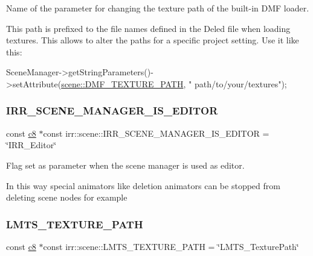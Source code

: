 Name of the parameter for changing the texture path of the built-\/in D\+MF loader. 

This path is prefixed to the file names defined in the Deled file when loading textures. This allows to alter the paths for a specific project setting. Use it like this\+: 
\begin{DoxyCode}
SceneManager->getStringParameters()->setAttribute(\hyperlink{namespaceirr_1_1scene_a0dc81c29a0fa37b3aa7c9dcfc9828eaa}{scene::DMF\_TEXTURE\_PATH}, \textcolor{stringliteral}{"
      path/to/your/textures"});
\end{DoxyCode}
 \mbox{\label{namespaceirr_1_1scene_a8a06a6d3f0afc46bbf1bf2bc461b0973}} 
\subsubsection{\texorpdfstring{I\+R\+R\+\_\+\+S\+C\+E\+N\+E\+\_\+\+M\+A\+N\+A\+G\+E\+R\+\_\+\+I\+S\+\_\+\+E\+D\+I\+T\+OR}{IRR\_SCENE\_MANAGER\_IS\_EDITOR}}
{\footnotesize\ttfamily const \hyperlink{namespaceirr_a9395eaea339bcb546b319e9c96bf7410}{c8} $\ast$const irr\+::scene\+::\+I\+R\+R\+\_\+\+S\+C\+E\+N\+E\+\_\+\+M\+A\+N\+A\+G\+E\+R\+\_\+\+I\+S\+\_\+\+E\+D\+I\+T\+OR = \char`\"{}I\+R\+R\+\_\+\+Editor\char`\"{}}



Flag set as parameter when the scene manager is used as editor. 

In this way special animators like deletion animators can be stopped from deleting scene nodes for example \mbox{\label{namespaceirr_1_1scene_a706d82611b9c61c9e2a7950dfef3bb1a}} 
\subsubsection{\texorpdfstring{L\+M\+T\+S\+\_\+\+T\+E\+X\+T\+U\+R\+E\+\_\+\+P\+A\+TH}{LMTS\_TEXTURE\_PATH}}
{\footnotesize\ttfamily const \hyperlink{namespaceirr_a9395eaea339bcb546b319e9c96bf7410}{c8} $\ast$const irr\+::scene\+::\+L\+M\+T\+S\+\_\+\+T\+E\+X\+T\+U\+R\+E\+\_\+\+P\+A\+TH = \char`\"{}L\+M\+T\+S\+\_\+\+Texture\+Path\char`\"{}}



